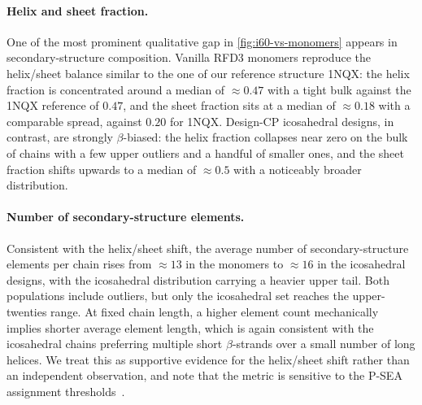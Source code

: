 \documentclass{article}
\theoremstyle{plain}
\theoremstyle{definition}
\theoremstyle{remark}
\begin{document}
\paragraph{Helix and sheet fraction.} One of the most prominent qualitative gap in \cref{fig:i60-vs-monomers} appears in secondary-structure composition. Vanilla RFD3 monomers reproduce the helix/sheet balance similar to the one of our reference structure 1NQX: the helix fraction is concentrated around a median of $\approx 0.47$ with a tight bulk against the 1NQX reference of $0.47$, and the sheet fraction sits at a median of $\approx 0.18$ with a comparable spread, against $0.20$ for 1NQX. Design-CP icosahedral designs, in contrast, are strongly $\beta$-biased: the helix fraction collapses near zero on the bulk of chains with a few upper outliers and a handful of smaller ones, and the sheet fraction shifts upwards to a median of $\approx 0.5$ with a noticeably broader distribution.

\paragraph{Number of secondary-structure elements.} Consistent with the helix/sheet shift, the average number of secondary-structure elements per chain rises from $\approx 13$ in the monomers to $\approx 16$ in the icosahedral designs, with the icosahedral distribution carrying a heavier upper tail. Both populations include outliers, but only the icosahedral set reaches the upper-twenties range. At fixed chain length, a higher element count mechanically implies shorter average element length, which is again consistent with the icosahedral chains preferring multiple short $\beta$-strands over a small number of long helices. We treat this as supportive evidence for the helix/sheet shift rather than an independent observation, and note that the metric is sensitive to the P-SEA assignment thresholds~\cite{labesse_p-sea_1997}.
\end{document}
